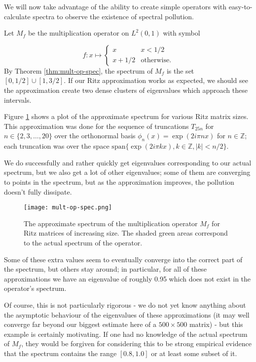 \documentclass[../main.tex]{subfiles}
\begin{document}
We will now take advantage of the ability to create simple operators with easy-to-calculate
spectra to observe the existence of spectral pollution.

\begin{example}
Let $M_f$ be the multiplication operator on $L^2(0, 1)$ with symbol

$$
f: x \mapsto \begin{cases}
x & x < 1/2 \\
x + 1/2 & \text{otherwise.}
\end{cases}
$$
By Theorem \ref{thm:mult-op-spec}, the spectrum of $M_f$ is the set $[0, 1/2] \cup [1, 3/2]$. If our Ritz approximation works as expected, we should
see the approximation create two dense clusters of eigenvalues which approach these intervals.
\end{example}

Figure \ref{fig:mult-op-spec} shows a plot of the approximate spectrum for various Ritz matrix sizes. This approximation was done for the sequence of
truncations $T_{25n}$ for $n \in \{2, 3, \hdots, 20\}$ over the orthonormal basis $\phi_n(x) = \exp(2 i \pi n x)$ for $n \in \mathbb{Z}$; each truncation was
over the space $\mathrm{span}\{\exp(2 i \pi k x), k \in \mathbb{Z}, |k| < n/2\}$.

We do successfully and rather quickly get eigenvalues corresponding to our actual spectrum, but we also get a lot of other eigenvalues; some of them are 
converging to points in the spectrum, but as the approximation improves, the pollution doesn't fully dissipate.

\begin{figure}[h]
\centering
\texttt{[image: mult-op-spec.png]}
\caption{The approximate spectrum of the multiplication operator $M_f$ for Ritz matrices of increasing size. The shaded green areas correspond to the 
actual spectrum of the operator.}\label{fig:mult-op-spec}
\end{figure}

Some of these extra values seem to eventually converge into the correct part of the spectrum, but others stay around; in particular, for all of these approximations we have an eigenvalue of roughly 0.95 which does not exist in the operator's spectrum.

Of course, this is not particularly rigorous - we do not yet know anything about the asymptotic behaviour of the eigenvalues of these approximations (it may well converge far beyond our biggest estimate here of a $500 \times 500$ matrix) - but this example is certainly motivating. If one had no knowledge of the actual spectrum of $M_f$, they would be forgiven for considering this to be strong empirical evidence that the spectrum contains the range $[0.8, 1.0]$ or at least some subset of it. 
\end{document}
